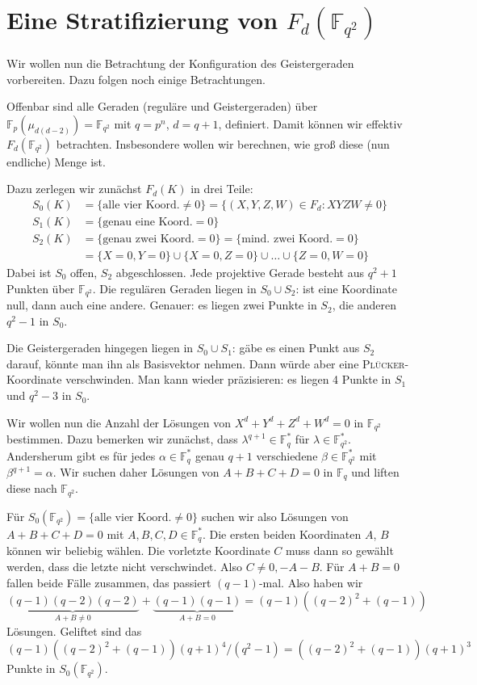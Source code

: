 \section{Eine Stratifizierung von $F_d(\mathbb F_{q^2})$}
Wir wollen nun die Betrachtung der Konfiguration des Geistergeraden vorbereiten. Dazu folgen noch einige Betrachtungen.

Offenbar sind alle Geraden (reguläre und Geistergeraden) über $\mathbb F_p(\mu_{d(d-2)}) = \mathbb F_{q^2}$ mit $q = p^n$, $d = q+1$, definiert. Damit können wir effektiv $F_d(\mathbb F_{q^2})$ betrachten. Insbesondere wollen wir berechnen, wie groß diese (nun endliche) Menge ist.

Dazu zerlegen wir zunächst $F_d(K)$ in drei Teile:
\begin{align*}
S_0(K) &= \{\text{alle vier Koord.}\neq 0\} = \{(X,Y,Z,W) \in F_d : XYZW \neq 0\} \\
S_1(K) &= \{\text{genau eine Koord.}= 0\} \\
S_2(K) &= \{\text{genau zwei Koord.}= 0\} = \{\text{mind. zwei Koord.}= 0\} \\
	&= \{X = 0, Y = 0\} \cup \{X = 0, Z = 0\} \cup \dots \cup \{Z = 0, W = 0\}
\end{align*}
Dabei ist $S_0$ offen, $S_2$ abgeschlossen. Jede projektive Gerade besteht aus $q^2+1$ Punkten über $\mathbb F_{q^2}$. Die regulären Geraden liegen in $S_0 \cup S_2$: ist eine Koordinate null, dann auch eine andere. Genauer: es liegen zwei Punkte in $S_2$, die anderen $q^2-1$ in $S_0$.

Die Geistergeraden hingegen liegen in $S_0 \cup S_1$: gäbe es einen Punkt aus $S_2$ darauf, könnte man ihn als Basisvektor nehmen. Dann würde aber eine \textsc{Plücker}-Koordinate verschwinden. Man kann wieder präzisieren: es liegen 4 Punkte in $S_1$ und $q^2-3$ in $S_0$.

Wir wollen nun die Anzahl der Lösungen von $X^d+Y^d+Z^d+W^d=0$ in $\mathbb F_{q^2}$ bestimmen. Dazu bemerken wir zunächst, dass $\lambda^{q+1} \in \mathbb F_q^*$ für $\lambda \in \mathbb F_{q^2}^*$. Andersherum gibt es für jedes $\alpha \in \mathbb F_q^*$ genau $q+1$ verschiedene $\beta \in \mathbb F_{q^2}^*$ mit $\beta^{q+1} = \alpha$. Wir suchen daher Lösungen von $A+B+C+D=0$ in $\mathbb F_q$ und liften diese nach $\mathbb F_{q^2}$.

Für $S_0(\mathbb F_{q^2}) = \{\text{alle vier Koord.}\neq 0\}$ suchen wir also Lösungen von $A+B+C+D=0$ mit $A,B,C,D \in \mathbb F_q^*$. Die ersten beiden Koordinaten $A$, $B$ können wir beliebig wählen. Die vorletzte Koordinate $C$ muss dann so gewählt werden, dass die letzte nicht verschwindet. Also $C \neq 0, -A-B$. Für $A+B=0$ fallen beide Fälle zusammen, das passiert $(q-1)$-mal. Also haben wir
\begin{equation*}
\underbrace{(q-1)(q-2)(q-2)}_{A+B \neq 0} + \underbrace{(q-1)(q-1)}_{A+B=0} = (q-1)((q-2)^2+(q-1))
\end{equation*}
Lösungen. Geliftet sind das
\begin{equation}
(q-1)((q-2)^2+(q-1))(q+1)^4/(q^2-1) = ((q-2)^2+(q-1))(q+1)^3
\end{equation}
Punkte in $S_0(\mathbb F_{q^2})$.


